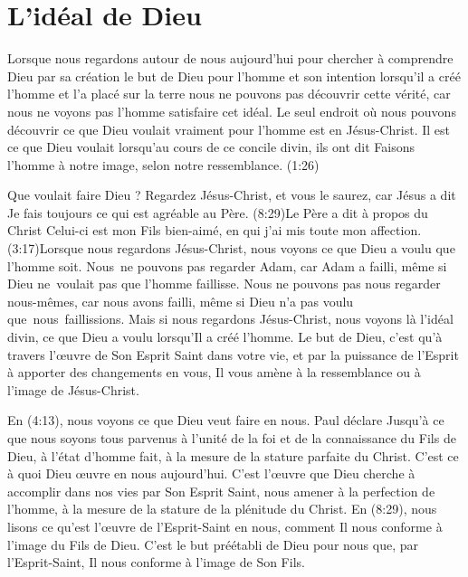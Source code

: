 \section{L'id\'eal de Dieu}

Lorsque nous regardons autour de nous aujourd'hui pour
 chercher à comprendre Dieu par sa création
 \ocadr le but de Dieu pour l'homme et son intention
 lorsqu'il a créé l'homme et l'a placé sur la terre \fcadr{}
 nous ne pouvons pas découvrir cette vérité,
 car nous ne voyons pas l'homme satisfaire cet idéal.
 Le seul endroit où nous pouvons découvrir ce que Dieu voulait vraiment
 pour l'homme est en Jésus-Christ.
 Il est ce que Dieu voulait lorsqu'au cours de ce concile divin, ils ont dit\frcolon{}
 \Og Faisons l'homme à notre image, selon notre ressemblance. \Fg{}
 (1:26)

Que voulait faire Dieu ?
 Regardez Jésus-Christ, et vous le saurez, car Jésus a dit\frcolon{}
 \Og Je fais toujours ce qui est agréable au Père. \Fg{}
 (8:29)Le Père a dit à propos du Christ\frcolon{}
 \Og Celui-ci est mon Fils bien-aimé, en qui j'ai mis toute mon affection. \Fg{}
 (3:17)Lorsque nous regardons Jésus-Christ,
 nous voyons ce que Dieu a voulu que l'homme soit.
 Nous~ne pouvons pas regarder Adam, car Adam a failli,
 même si Dieu ne~voulait pas que l'homme faillisse.
 Nous ne pouvons pas nous regarder nous-mêmes,
 car nous avons failli, même si Dieu n'a pas voulu que~nous~faillissions.
 Mais si nous regardons Jésus-Christ, nous voyons là l'idéal divin,
 ce que Dieu a voulu lorsqu'Il a créé l'homme.
 Le but de Dieu, c'est qu'à travers l'œuvre de Son Esprit Saint dans votre vie,
 et par la puissance de l'Esprit à apporter des changements en vous,
 Il vous amène à la ressemblance ou à l'image de Jésus-Christ.

En (4:13), nous voyons ce que Dieu veut faire en nous.
 Paul déclare\frcolon{}
 \Og Jusqu'à ce que nous soyons tous parvenus à l'unité de la foi
 et de la connaissance du Fils de Dieu, à l'état d'homme fait,
 à la mesure de la stature parfaite du Christ. \Fg{}
 C'est ce à quoi Dieu œuvre en nous aujourd'hui.
 C'est l'œuvre que Dieu cherche à accomplir dans nos vies
 par Son Esprit Saint, nous amener à la perfection de l'homme,
 à la mesure de la stature de la plénitude du Christ.
 En (8:29), nous lisons
 ce qu'est l'œuvre de l'Esprit-Saint en nous,
 comment Il nous conforme à l'image du Fils de Dieu.
 C'est le but préétabli de Dieu pour nous
 que, par l'Esprit-Saint, Il nous conforme à l'image de Son Fils.


